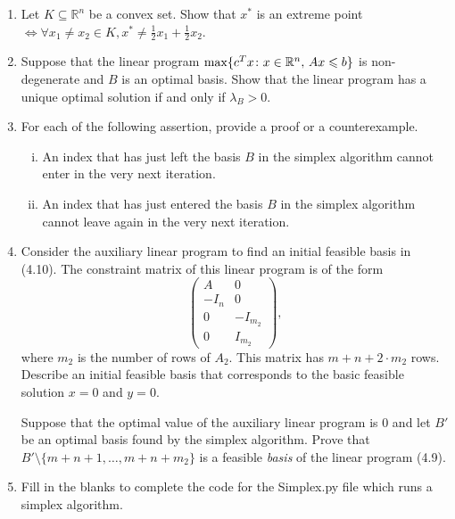 \documentclass[11pt]{article}
\institute{\'Ecole Polytechnique F\'ed\'erale de Lausanne}
\newcommand{\setR}{\mathbb{R}}
\renewcommand{\leq}{\leqslant}
\begin{document}
\makeheader

\begin{enumerate}[1)]
\item Let $K \subseteq \setR^n$ be a convex set. Show that $x^\ast$ is an extreme point $\iff \forall x_1 \neq x_2 \in K, x^\ast \neq \frac{1}{2}x_1 + \frac{1}{2}x_2$. 


\item Suppose that the linear program $\max \{c^Tx \colon x \in \R^n, \, Ax \leq b\}$ is non-degenerate and $B$ is an optimal basis. Show that the linear program has a unique optimal solution if and only if $\lambda_B>0$. 


\item For each of the following assertion, provide a proof or a counterexample. 
  \begin{enumerate}[i)]
  \item An index that has just left the basis $B$ in the simplex
    algorithm cannot enter in the very next iteration.
  \item An index that has just entered the basis $B$ in the simplex
    algorithm cannot leave again in the very next iteration. 
  \end{enumerate}
  
  
 \item Consider the auxiliary linear program to find an initial feasible basis in (4.10). The constraint matrix of this linear program is of the form
  \begin{displaymath}
    \begin{pmatrix}
      A & 0 \\
      -I_n & 0\\ 
      0 & -I_{m_2}\\
      0 & I_{m_2}
    \end{pmatrix},
  \end{displaymath}
  where $m_2$ is the number of rows of $A_2$. This matrix has $m+n+2\cdot m_2$ rows. Describe an initial feasible basis that corresponds to the basic feasible solution $x = 0$ and $y=0$. 

Suppose that the optimal value of the auxiliary linear program is $0$ and let $B'$   be an optimal basis found by the simplex algorithm. Prove that $B' \setminus \{m+n+1,\dots,m+n+m_2\}$ is a feasible \emph{basis} of the linear program (4.9). 
  
 \item Fill in the blanks to complete the code for the Simplex.py file which runs a simplex algorithm. 




\end{enumerate}



  
\end{document}
